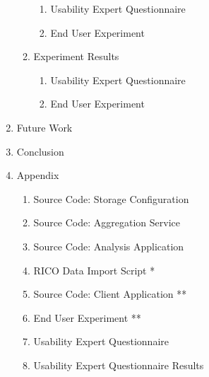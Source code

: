 \begin{enumerate}[noitemsep,label=\arabic*.]
\begin{enumerate}[noitemsep,label=\arabic*.]
\begin{enumerate}[noitemsep,label=\arabic*.]
		\item Usability Expert Questionnaire
		\item End User Experiment
		\end{enumerate}
	\item Experiment Results
		\begin{enumerate}[noitemsep,label=\arabic*.]
		\item Usability Expert Questionnaire
		\item End User Experiment
		\end{enumerate}	
	\end{enumerate}
\item Future Work
\item Conclusion
\item Appendix
	\begin{enumerate}[noitemsep,label=\arabic*.]
	\item Source Code: Storage Configuration
	\item Source Code: Aggregation Service
	\item Source Code: Analysis Application
	\item RICO Data Import Script *
	\item Source Code: Client Application **
	\item End User Experiment **
	\item Usability Expert Questionnaire
	\item Usability Expert Questionnaire Results
	\end{enumerate}
\end{enumerate}
